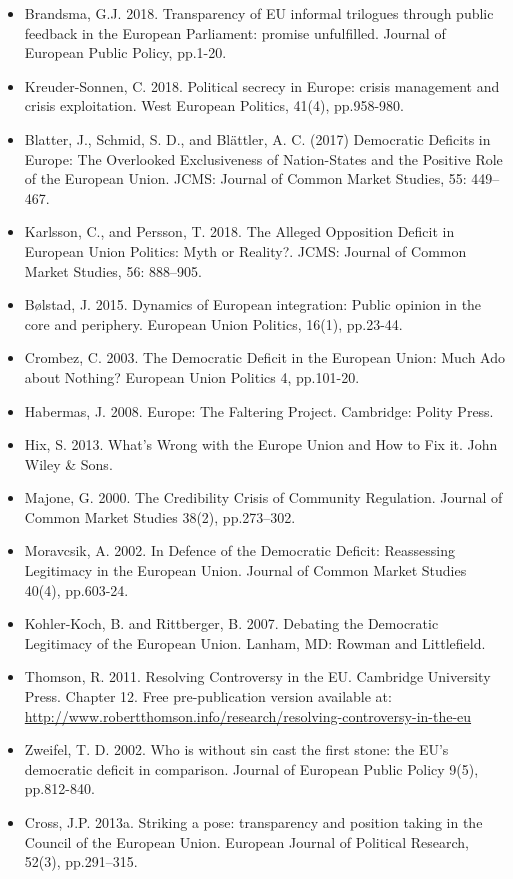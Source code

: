 \begin{itemize}
	\item Brandsma, G.J. 2018. Transparency of EU informal trilogues through public feedback in the European Parliament: promise unfulfilled. Journal of European Public Policy, pp.1-20.
	\item Kreuder-Sonnen, C. 2018. Political secrecy in Europe: crisis management and crisis exploitation. West European Politics, 41(4), pp.958-980.
	\item Blatter, J., Schmid, S. D., and Bl{\"a}ttler, A. C. (2017) Democratic Deficits in Europe: The Overlooked Exclusiveness of Nation-States and the Positive Role of the European Union. JCMS: Journal of Common Market Studies, 55: 449–467.
	\item Karlsson, C., and Persson, T. 2018. The Alleged Opposition Deficit in European Union Politics: Myth or Reality?. JCMS: Journal of Common Market Studies, 56: 888–905.
	\item B{\o}lstad, J. 2015. Dynamics of European integration: Public opinion in the core and periphery. European Union Politics, 16(1), pp.23-44.
	\item Crombez, C. 2003. The Democratic Deficit in the European Union: Much Ado about Nothing? European Union Politics 4, pp.101-20.
	\item Habermas, J. 2008. Europe: The Faltering Project. Cambridge: Polity Press.
	\item Hix, S.	2013. What's Wrong with the Europe Union and How to Fix it. John Wiley \& Sons.
	\item Majone, G. 2000. The Credibility Crisis of Community Regulation. Journal of Common Market Studies 38(2), pp.273–302.
	\item Moravcsik, A. 2002. In Defence of the Democratic Deficit: Reassessing Legitimacy in the European Union. Journal of Common Market Studies 40(4), pp.603-24.
	\item Kohler-Koch, B. and Rittberger, B. 2007. Debating the Democratic Legitimacy of the European Union. Lanham, MD: Rowman and Littlefield.
	\item Thomson, R. 2011. Resolving Controversy in the EU. Cambridge University Press. Chapter 12. Free pre-publication version available at: \url{http://www.robertthomson.info/research/resolving-controversy-in-the-eu}
	\item Zweifel, T. D. 2002. Who is without sin cast the first stone: the EU's democratic deficit in comparison. Journal of European Public Policy 9(5), pp.812-840.
	\item Cross, J.P. 2013a. Striking a pose: transparency and position taking in the Council of the European Union. European Journal of Political Research, 52(3), pp.291–315.

\end{itemize}
